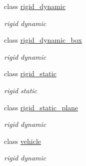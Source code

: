 \begin{DoxyCompactItemize}
class \hyperlink{classnebula_1_1content_1_1actor_1_1physics_1_1rigid__dynamic}{rigid\_\-dynamic}
\begin{DoxyCompactList}\small\item\em rigid dynamic \item\end{DoxyCompactList}\item 
class \hyperlink{classnebula_1_1content_1_1actor_1_1physics_1_1rigid__dynamic__box}{rigid\_\-dynamic\_\-box}
\begin{DoxyCompactList}\small\item\em rigid dynamic \item\end{DoxyCompactList}\item 
class \hyperlink{classnebula_1_1content_1_1actor_1_1physics_1_1rigid__static}{rigid\_\-static}
\begin{DoxyCompactList}\small\item\em rigid static \item\end{DoxyCompactList}\item 
class \hyperlink{classnebula_1_1content_1_1actor_1_1physics_1_1rigid__static__plane}{rigid\_\-static\_\-plane}
\begin{DoxyCompactList}\small\item\em rigid dynamic \item\end{DoxyCompactList}\item 
class \hyperlink{classnebula_1_1content_1_1actor_1_1physics_1_1vehicle}{vehicle}
\begin{DoxyCompactList}\small\item\em rigid dynamic \item\end{DoxyCompactList}\end{DoxyCompactItemize}

